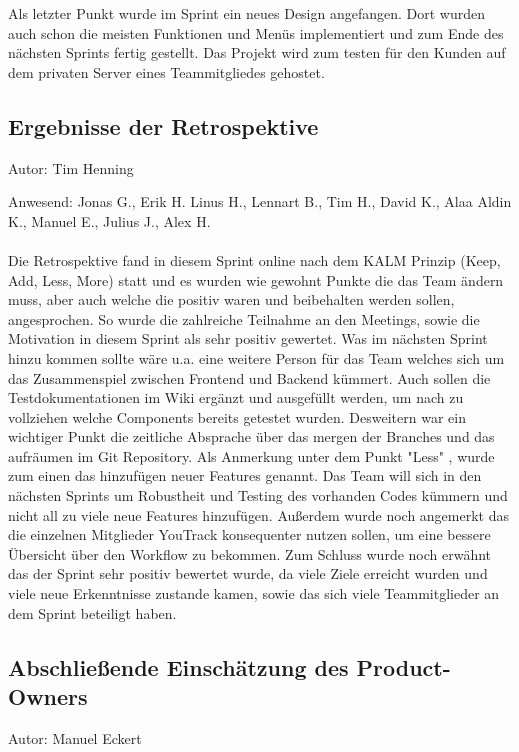 Als letzter Punkt wurde im Sprint ein neues Design angefangen. Dort wurden auch schon die meisten Funktionen und Menüs implementiert und zum Ende des nächsten Sprints fertig gestellt. Das Projekt wird zum testen für den Kunden auf dem privaten Server eines Teammitgliedes gehostet.


\subsection{Ergebnisse der Retrospektive}
{\small Autor: Tim Henning}

Anwesend: Jonas G., Erik H. Linus H., Lennart B., Tim H., David K., Alaa Aldin K., Manuel E., Julius J., Alex H.\\
\\

Die Retrospektive fand in diesem Sprint online nach dem KALM Prinzip (Keep, Add, Less, More) statt und es wurden wie gewohnt Punkte die das Team ändern muss, aber auch welche die positiv waren und beibehalten werden sollen, angesprochen. So wurde die zahlreiche Teilnahme an den Meetings, sowie die Motivation in diesem Sprint als sehr positiv gewertet. Was im nächsten Sprint hinzu kommen sollte wäre u.a. eine weitere Person für das Team welches sich um das Zusammenspiel zwischen Frontend und Backend kümmert. Auch sollen die Testdokumentationen im Wiki ergänzt und ausgefüllt werden, um nach zu vollziehen welche Components bereits getestet wurden. Desweitern war ein wichtiger Punkt die zeitliche Absprache über das mergen der Branches und das aufräumen im Git Repository. Als Anmerkung unter dem Punkt "Less" , wurde zum einen das hinzufügen neuer Features genannt. Das Team will sich in den nächsten Sprints um Robustheit und Testing des vorhanden Codes kümmern und nicht all zu viele neue Features hinzufügen. Außerdem wurde noch angemerkt das die einzelnen Mitglieder YouTrack konsequenter nutzen sollen, um eine bessere Übersicht über den Workflow zu bekommen. Zum Schluss wurde noch erwähnt das der Sprint sehr positiv bewertet wurde, da viele Ziele erreicht wurden und viele neue Erkenntnisse zustande kamen, sowie das sich viele Teammitglieder an dem Sprint beteiligt haben.

\subsection{Abschließende Einschätzung des Product-Owners}
{\small Autor: Manuel Eckert}

